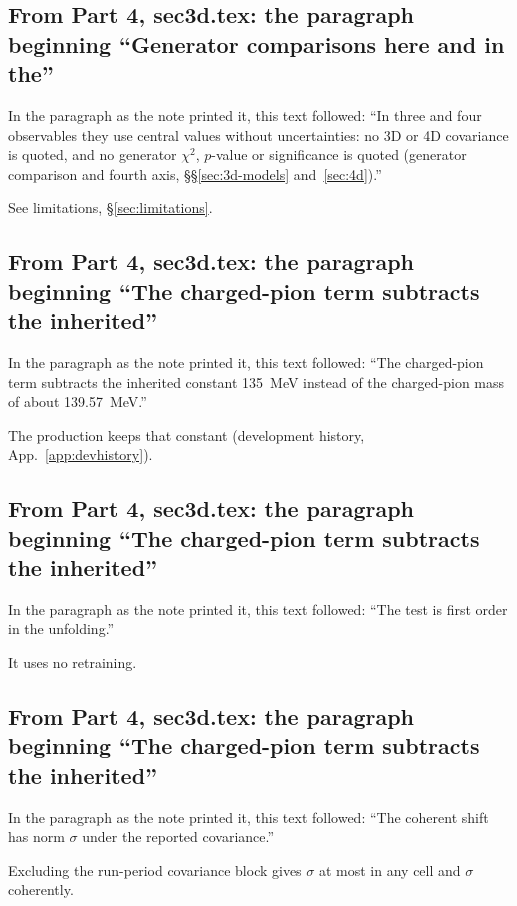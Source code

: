 \subsection{From Part 4, sec3d.tex: the paragraph beginning ``Generator comparisons here and in the''}
In the paragraph as the note printed it, this text followed: ``In three and four observables they use central values without uncertainties: no 3D or 4D covariance is quoted, and no generator $\chi^{2}$, $p$-value or significance is quoted (generator comparison and fourth axis, \S\S\ref{sec:3d-models} and~\ref{sec:4d}).''\par
See limitations, \S\ref{sec:limitations}.

\subsection{From Part 4, sec3d.tex: the paragraph beginning ``The charged-pion term subtracts the inherited''}
In the paragraph as the note printed it, this text followed: ``The charged-pion term subtracts the inherited constant \SI{135}{MeV} instead of the charged-pion mass of about \SI{139.57}{MeV}.''\par
The production keeps that constant (development history, App.~\ref{app:devhistory}).

\subsection{From Part 4, sec3d.tex: the paragraph beginning ``The charged-pion term subtracts the inherited''}
In the paragraph as the note printed it, this text followed: ``The test is first order in the unfolding.''\par
It uses no retraining.

\subsection{From Part 4, sec3d.tex: the paragraph beginning ``The charged-pion term subtracts the inherited''}
In the paragraph as the note printed it, this text followed: ``The coherent shift has norm $\sigma$ under the reported covariance.''\par
Excluding the run-period covariance block gives $\sigma$ at most in any cell and $\sigma$ coherently.

